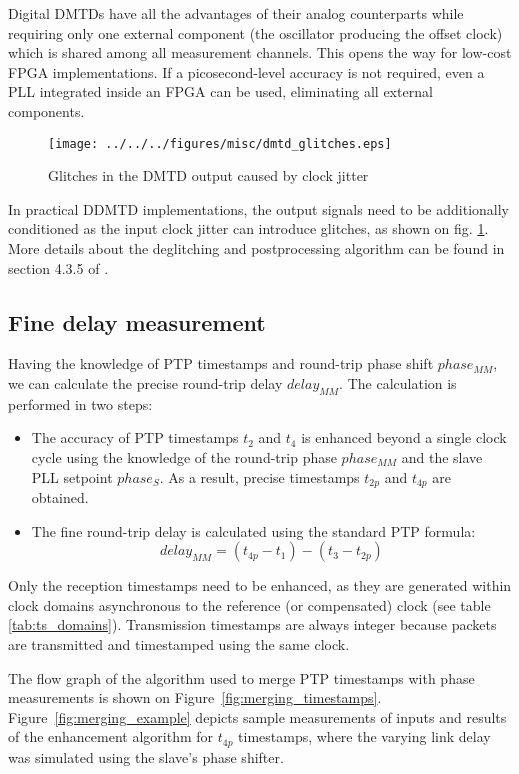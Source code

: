 Digital DMTDs have all the advantages of their analog counterparts while
requiring only one external component (the oscillator producing the offset
clock) which is shared among all measurement channels.	This opens the way
for low-cost FPGA implementations. If a picosecond-level accuracy is not
required, even a PLL integrated inside an FPGA can be used, eliminating all
external components.
\begin{figure}[ht!]
  \centering
  \texttt{[image: ../../../figures/misc/dmtd\_glitches.eps]}
  \caption{Glitches in the DMTD output caused by clock jitter}
  \label{fig:dmtd_glitches}
\end{figure}
In practical DDMTD implementations, the output signals need to be additionally
conditioned as the input clock jitter can introduce glitches, as shown
on fig. \ref{fig:dmtd_glitches}. More details about the deglitching and
postprocessing algorithm can be found in section 4.3.5 of \cite{tomekMSC}.

\subsection{Fine delay measurement}
\label{s:fine_delay}
Having the knowledge of PTP timestamps and round-trip phase shift $phase_{MM}$,
we can calculate the precise round-trip delay $delay_{MM}$. The calculation
is performed in two steps:
\begin{itemize}
\item The accuracy of PTP timestamps $t_{2}$ and $t_{4}$ is enhanced beyond a
single clock cycle using the knowledge of the round-trip phase $phase_{MM}$
and the slave PLL setpoint $phase_{S}$. As a result, precise timestamps
$t_{2p}$ and $t_{4p}$ are obtained.
\item The fine round-trip delay is calculated using the standard PTP formula:
\begin{equation}
\label{eq:ptp_precise}
delay_{MM} = (t_{4p} - t_{1}) - (t_{3} - t_{2p})
\end{equation}
\end{itemize}

Only the reception timestamps need to be enhanced, as they are generated
within clock domains asynchronous to the reference (or compensated) clock
(see table \ref{tab:ts_domains}). Transmission timestamps are always integer
because packets are transmitted and timestamped using the same clock.

The flow graph of the algorithm used to merge PTP timestamps with
phase measurements is shown on Figure~\ref{fig:merging_timestamps}. 
Figure~\ref{fig:merging_example} depicts sample measurements of inputs and results
of the enhancement algorithm for $t_{4p}$ timestamps, where the varying link
delay was simulated using the slave's phase shifter.


